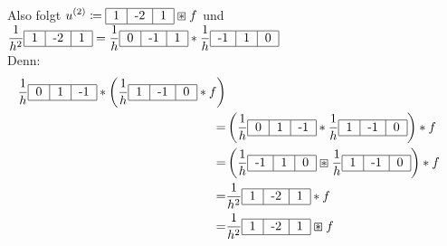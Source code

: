 \documentclass{article}
\theoremstyle{plain}
\theoremstyle{definition}
\numberwithin{equation}{section}
\newcommand{\filter}[1] {
\begin{tabular}{|c|c|c|}
    \hline
    #1\\
    \hline
\end{tabular}
}
\begin{document}
    Also folgt $\displaystyle u^{(2)} \coloneqq \begin{tabular}{|c|c|c|}
        \hline
        1 & -2 & 1\\
        \hline
        \end{tabular} \boxast f$ und $\displaystyle \frac{1}{h^2}\begin{tabular}{|c|c|c|}
            \hline
            1 & -2 & 1\\
            \hline
            \end{tabular} = \frac{1}{h}\begin{tabular}{|c|c|c|}
                \hline
                0 & -1 & 1\\
                \hline
                \end{tabular} * \frac{1}{h}\begin{tabular}{|c|c|c|}
                    \hline
                    -1 & 1 & 0\\
                    \hline
                    \end{tabular}$\\
    Denn:
    \begin{align*}
        \frac{1}{h} \filter{0 & 1 & -1} * \left(\frac{1}{h} \filter{1 & -1 & 0} * f\right)\\
        =& \left(\frac{1}{h} \filter{ 0 & 1 & -1} * \frac{1}{h} \filter{1 & -1 & 0}\right)*f\\
        =& \left(\frac{1}{h} \filter{ -1 & 1 & 0} \boxast \frac{1}{h} \filter{1 & -1 & 0}\right)*f\\
        =& \frac{1}{h^2} \filter{1 & -2 & 1} * f \\
        =&\frac{1}{h^2} \filter{1 & -2 & 1} \boxast f
    \end{align*}
\end{document}
